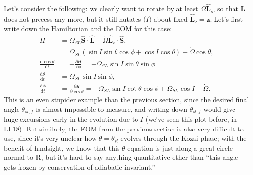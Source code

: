 \documentclass[11pt,
        usenames, %
        dvipsnames %
    ]{article}
\newcommand*{\rd}[2]{\frac{\mathrm{d}#1}{\mathrm{d}#2}}
\newcommand*{\pd}[2]{\frac{\partial#1}{\partial#2}}
\newcommand*{\bm}[1]{\boldsymbol{\mathbf{#1}}}
\newcommand*{\uv}[1]{\hat{\bm{#1}}}
\newcommand*{\p}[1]{\left(#1\right)}
\begin{document}
Let's consider the following: we clearly want to rotate by at least
$\dot{\Omega} \uv{L}_o$, so that $\bm{L}$ does not precess any more, but it
still nutates ($\dot{I}$) about fixed $\uv{L}_o = \uv{z}$. Let's first write
down the Hamiltonian and the EOM for this case:
\begin{align}
    H &= \Omega_{SL} \uv{S} \cdot \uv{L} - \dot{\Omega} \uv{L}_o \cdot \uv{S},\\
        &= \Omega_{SL}\p{\sin I \sin \theta \cos \phi
            + \cos I \cos \theta}
            - \dot{\Omega}\cos \theta,\\
    \rd{\cos \theta}{t} &= -\pd{H}{\phi}
        = -\Omega_{SL}\sin I\sin \theta \sin \phi,\\
    \rd{\theta}{t} &= \Omega_{SL}\sin I \sin \phi,\\
    \rd{\phi}{t} &= \pd{H}{\cos \theta}
        = -\Omega_{SL}\sin I \cot \theta \cos \phi + \Omega_{SL}\cos I
            - \dot{\Omega}.
\end{align}
This is an even stupider example than the previous section, since the desired
final angle $\theta_{sl, f}$ is almost impossible to measure, and writing down
$\dot{\theta}_{sl, f}$ would give huge excursions early in the evolution due to
$\dot{I}$ (we've seen this plot before, in LL18). But similarly, the EOM from
the previous section is also very difficult to use, since it's very unclear how
$\theta = \theta_{sl}$ evolves through the Kozai phase; with the benefit of
hindsight, we know that this $\dot{\theta}$ equation is just along a great
circle normal to $\bm{R}$, but it's hard to say anything quantitative other than
``this angle gets frozen by conservation of adiabatic invariant.''
\end{document}
